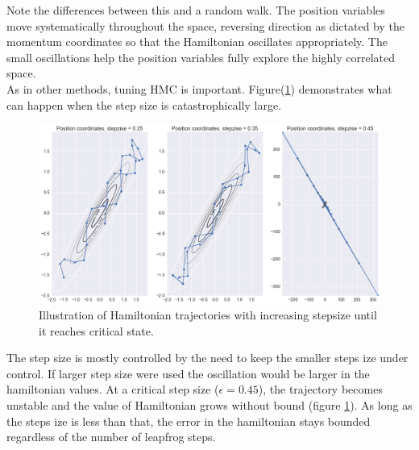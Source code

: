 \documentclass{article}
\numberwithin{equation}{section}
\begin{document}
Note the differences between this and a random walk. The position variables move systematically throughout the space, reversing direction as dictated by the momentum coordinates so that the Hamiltonian oscillates appropriately. The small oscillations help the position variables fully explore the highly correlated space.\\

As in other methods, tuning HMC is important. Figure(\ref{Fig:2}) demonstrates what can happen when the step size is catastrophically large.
\begin{figure}[H]
\centering
  \includegraphics[width=1\linewidth]{HMC_critical_stepsize.png}
  \caption{Illustration of Hamiltonian trajectories with increasing stepsize until it reaches critical state.}
\label{Fig:2}
\end{figure}

The step size is mostly controlled by the need to keep the smaller steps ize under control. If larger step size were used the oscillation would be larger in the hamiltonian values. At a critical step size ($\epsilon =0.45$), the trajectory becomes unstable and the value of Hamiltonian grows without bound (figure \ref{Fig:2}). As long as the steps ize is less than that, the error in the hamiltonian stays bounded regardless of the number of leapfrog steps.
\end{document}
